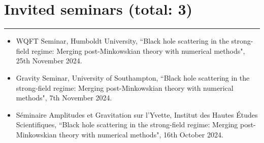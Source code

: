 \documentclass[10.5pt, oneside]{article}   	%
\begin{document}



 
  {\color{Sectioncolour}
\section*{Invited seminars {\rm (total: 3)}}
\vspace{-3mm}
\noindent\rule{\linewidth}{0.6pt}}
\begin{itemize}
\item WQFT Seminar, Humboldt University, ``Black hole scattering in the strong-field regime: Merging post-Minkowskian theory with numerical methods", 25th November 2024.
\item Gravity Seminar, University of Southampton, ``Black hole scattering in the strong-field regime: Merging post-Minkowskian theory with numerical methods", 7th November 2024.
\item Séminaire Amplitudes et Gravitation sur l'Yvette, Institut des Hautes Études Scientifiques, ``Black hole scattering in the strong-field regime: Merging post-Minkowskian theory with numerical methods", 16th October 2024.
\end{itemize}
\end{document}
